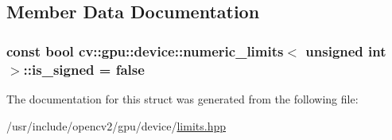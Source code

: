 \subsection{Member Data Documentation}
\hypertarget{structcv_1_1gpu_1_1device_1_1numeric__limits_3_01unsigned_01int_01_4_a20ba90d6e6f31a0e9121ac9fbb05756c}{
\subsubsection[{is\-\_\-signed}]{\setlength{\rightskip}{0pt plus 5cm}const bool {\bf cv\-::gpu\-::device\-::numeric\-\_\-limits}$<$ unsigned int $>$\-::is\-\_\-signed = {\bf false}\hspace{0.3cm}{\ttfamily [static]}}}\label{structcv_1_1gpu_1_1device_1_1numeric__limits_3_01unsigned_01int_01_4_a20ba90d6e6f31a0e9121ac9fbb05756c}


The documentation for this struct was generated from the following file\-:\begin{DoxyCompactItemize}
\item 
/usr/include/opencv2/gpu/device/\hyperlink{limits_8hpp}{limits.\-hpp}\end{DoxyCompactItemize}
